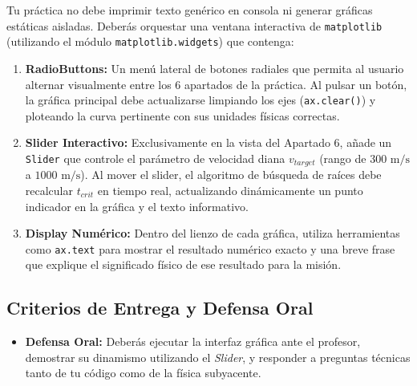 	Tu práctica no debe imprimir texto genérico en consola ni generar gráficas estáticas aisladas. Deberás orquestar una ventana interactiva de \texttt{matplotlib} (utilizando el módulo \texttt{matplotlib.widgets}) que contenga:
	\begin{enumerate}
		\item \textbf{RadioButtons:} Un menú lateral de botones radiales que permita al usuario alternar visualmente entre los 6 apartados de la práctica. Al pulsar un botón, la gráfica principal debe actualizarse limpiando los ejes (\texttt{ax.clear()}) y ploteando la curva pertinente con sus unidades físicas correctas.
		\item \textbf{Slider Interactivo:} Exclusivamente en la vista del Apartado 6, añade un \texttt{Slider} que controle el parámetro de velocidad diana $v_{target}$ (rango de $300 \text{ m/s}$ a $1000 \text{ m/s}$). Al mover el slider, el algoritmo de búsqueda de raíces debe recalcular $t_{crit}$ en tiempo real, actualizando dinámicamente un punto indicador en la gráfica y el texto informativo.
		\item \textbf{Display Numérico:} Dentro del lienzo de cada gráfica, utiliza herramientas como \texttt{ax.text} para mostrar el resultado numérico exacto y una breve frase que explique el significado físico de ese resultado para la misión.
	\end{enumerate}
	
	\subsection*{Criterios de Entrega y Defensa Oral}
	
	\begin{itemize}
		
		\item \textbf{Defensa Oral:} Deberás ejecutar la interfaz gráfica ante el profesor, demostrar su dinamismo utilizando el \textit{Slider}, y responder a preguntas técnicas tanto de tu código como de la física subyacente.
	\end{itemize}
	
